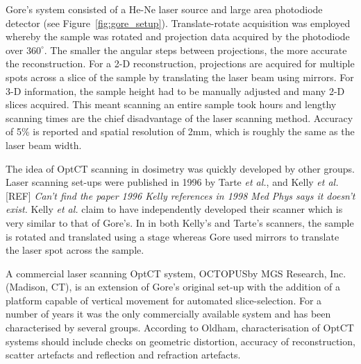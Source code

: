 \documentclass[12pt]{article}
\begin{document}
Gore's system consisted of a  He-Ne laser source and large area photodiode detector (see Figure~\ref{fig:gore_setup}). Translate-rotate acquisition was employed whereby the sample was rotated and projection data  acquired  by the photodiode over $360^{\circ}$. The smaller the angular steps between projections, the more accurate the reconstruction. \cite{russ2002image} For a 2-D reconstruction, projections are acquired for multiple spots across a slice of the sample by translating the laser beam using mirrors. For 3-D information, the sample height  had to be manually adjusted and many 2-D slices acquired. This meant scanning an entire sample took  hours and lengthy scanning times are the chief disadvantage of the laser scanning method.  Accuracy of 5\% is reported and spatial resolution of 2mm, which is roughly the same as the laser beam width. \cite{Gore:1999tg}

The idea of OptCT scanning in dosimetry was quickly developed by other groups. Laser scanning set-ups were published in 1996 by Tarte \textit{et al.},  \cite{Tarte:2006} and Kelly \textit{et al.} [REF]
\textit{Can't find the paper 1996 Kelly references in 1998 \cite{Kelly:1998} Med Phys says it doesn't exist.}
Kelly \textit{et al.} claim to have independently developed their scanner which is very similar to that of Gore's. In in both Kelly's and Tarte's  scanners, the sample is rotated and translated using a stage whereas Gore used mirrors to translate the laser spot across the sample. 


A commercial laser scanning OptCT system, OCTOPUS\texttrademark by MGS Research, Inc.
(Madison, CT),  is an extension of Gore's original set-up with the addition of a platform capable of vertical movement for automated slice-selection. \cite{Islam:2003gs} For a number of years it was the only commercially available system and has been characterised by several groups. \cite{Xu:2003cc, Islam:2003gs, Xu:2004iv, Sakhalkar:2009hb} According to Oldham, characterisation of OptCT systems should include checks on geometric distortion, accuracy of reconstruction, scatter artefacts and reflection and refraction artefacts.\cite{Oldham:2004cj}


 

\end{document}
